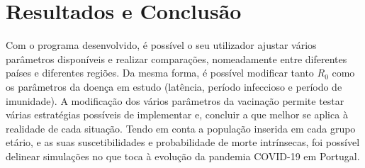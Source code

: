 \section{Resultados e Conclusão}
Com o programa desenvolvido, é possível o seu utilizador ajustar vários parâmetros disponíveis e realizar comparações, nomeadamente entre diferentes países e diferentes regiões.
Da mesma forma, é possível modificar tanto $R_0$ como os parâmetros da doença em estudo (latência, período infeccioso e período de imunidade).
A modificação dos vários parâmetros da vacinação permite testar várias estratégias possíveis de implementar e, concluir a que melhor se aplica à realidade de cada situação.
Tendo em conta a população inserida em cada grupo etário, e as suas suscetibilidades e probabilidade de morte intrínsecas, foi possível delinear simulações no que toca à evolução da pandemia COVID-19 em Portugal.

